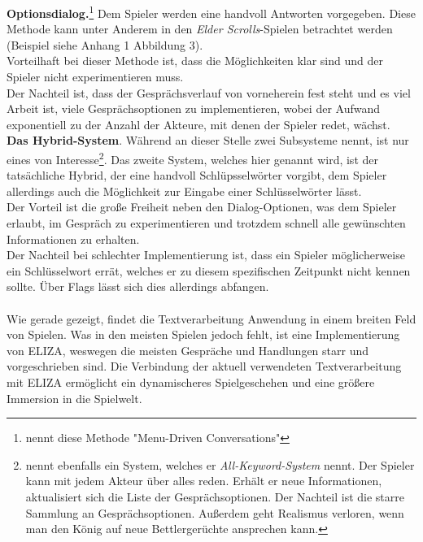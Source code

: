 \documentclass[12pt,twoside]{article}
\theoremstyle{plain}
\theoremstyle{definition}
\theoremstyle{remark}
\begin{document}
\textbf{Optionsdialog.}\footnote{\cite{npcs} nennt diese Methode "Menu-Driven Conversations"}
Dem Spieler werden eine handvoll Antworten vorgegeben.
Diese Methode kann unter Anderem in den \textit{Elder Scrolls}-Spielen betrachtet werden (Beispiel siehe Anhang 1 Abbildung 3).\\
Vorteilhaft bei dieser Methode ist, dass die Möglichkeiten klar sind und der Spieler nicht experimentieren muss.\\
Der Nachteil ist, dass der Gesprächsverlauf von vorneherein fest steht und es viel Arbeit ist, viele Gesprächsoptionen zu implementieren, wobei der Aufwand exponentiell zu der Anzahl der Akteure, mit denen der Spieler redet, wächst.\\
\textbf{Das Hybrid-System}.
Während \cite{npcs} an dieser Stelle zwei Subsysteme nennt, ist nur eines von Interesse\footnote{\cite{npcs} nennt ebenfalls ein System, welches er \textit{All-Keyword-System} nennt. Der Spieler kann mit jedem Akteur über alles reden. Erhält er neue Informationen, aktualisiert sich die Liste der Gesprächsoptionen. Der Nachteil ist die starre Sammlung an Gesprächsoptionen. Außerdem geht Realismus verloren, wenn man den König auf neue Bettlergerüchte ansprechen kann.}.
Das zweite System, welches hier genannt wird, ist der tatsächliche Hybrid, der eine handvoll Schlüpsselwörter vorgibt, dem Spieler allerdings auch die Möglichkeit zur Eingabe einer Schlüsselwörter lässt.\\
Der Vorteil ist die große Freiheit neben den Dialog-Optionen, was dem Spieler erlaubt, im Gespräch zu experimentieren und trotzdem schnell alle gewünschten Informationen zu erhalten.\\
Der Nachteil bei schlechter Implementierung ist, dass ein Spieler möglicherweise ein Schlüsselwort errät, welches er zu diesem spezifischen Zeitpunkt nicht kennen sollte. Über Flags lässt sich dies allerdings abfangen.\\
\\
Wie gerade gezeigt, findet die Textverarbeitung Anwendung in einem breiten Feld von Spielen.
Was in den meisten Spielen jedoch fehlt, ist eine Implementierung von ELIZA, weswegen die meisten Gespräche und Handlungen starr und vorgeschrieben sind.
Die Verbindung der aktuell verwendeten Textverarbeitung mit ELIZA ermöglicht ein dynamischeres Spielgeschehen und eine größere Immersion in die Spielwelt.
\end{document}
